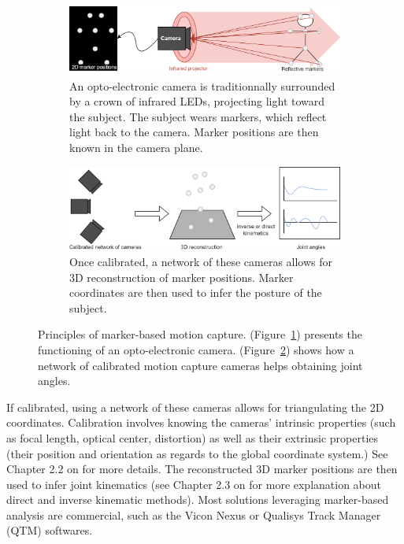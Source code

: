 \begin{figure}[hbtp]
	\centering
	\begin{subfigure}[b]{1\textwidth}
		\centering
		\def\svgwidth{\columnwidth}
		\fontsize{10pt}{10pt}\selectfont
		\includegraphics[width=\linewidth]{"../Chap1/Figures/Fig_Markers_1.png"}
		\caption{An opto-electronic camera is traditionnally surrounded by a crown of infrared LEDs, projecting light toward the subject. The subject wears markers, which reflect light back to the camera. Marker positions are then known in the camera plane.}
		\label{fig_mk1}
	\end{subfigure}
	\qquad
	\begin{subfigure}[b]{1\textwidth}
		\centering
		\def\svgwidth{\columnwidth}
		\fontsize{10pt}{10pt}\selectfont
		\includegraphics[width=\linewidth]{"../Chap1/Figures/Fig_Markers_2.png"}
		\caption{Once calibrated, a network of these cameras allows for 3D reconstruction of marker positions. Marker coordinates are then used to infer the posture of the subject.}
		\label{fig_mk2}
	\end{subfigure}
	\caption{Principles of marker-based motion capture. (Figure~\ref{fig_mk1}) presents the functioning of an opto-electronic camera. (Figure~\ref{fig_mk2}) shows how a network of calibrated motion capture cameras helps obtaining joint angles.}
	\label{fig_mk}
\end{figure}

\clearpage
If calibrated, using a network of these cameras allows for triangulating the 2D coordinates. Calibration involves knowing the cameras' intrinsic properties (such as focal length, optical center, distortion) as well as their extrinsic properties (their position and orientation as regards to the global coordinate system.) See Chapter 2.2 on  for more details. The reconstructed 3D marker positions are then used to infer joint kinematics (see Chapter 2.3 on  for more explanation about direct and inverse kinematic methods). Most solutions leveraging marker-based analysis are commercial, such as the Vicon Nexus \cite{Qualisys} or Qualisys Track Manager (QTM) \cite{Vicon} softwares.

